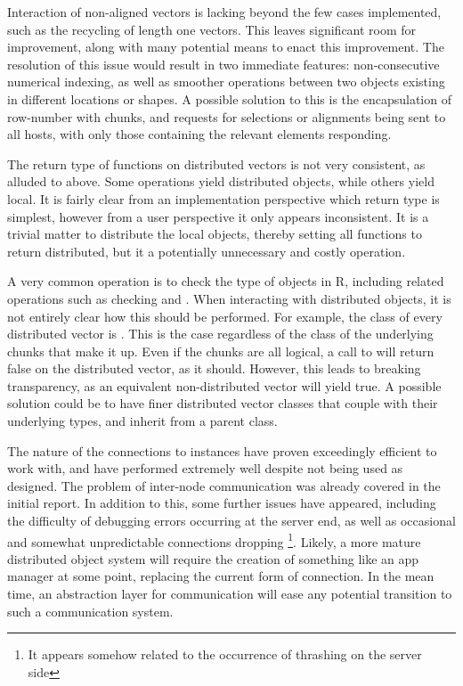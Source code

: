 Interaction of non-aligned vectors is lacking beyond the few cases implemented, such as the recycling of length one vectors.
This leaves significant room for improvement, along with many potential means to enact this improvement.
The resolution of this issue would result in two immediate features: non-consecutive numerical indexing, as well as smoother operations between two objects existing in different locations or shapes.
A possible solution to this is the encapsulation of row-number with chunks, and requests for selections or alignments being sent to all hosts, with only those containing the relevant elements responding.

The return type of functions on distributed vectors is not very consistent, as alluded to above.
Some operations yield distributed objects, while others yield local.
It is fairly clear from an implementation perspective which return type is simplest, however from a user perspective it only appears inconsistent.
It is a trivial matter to distribute the local objects, thereby setting all functions to return distributed, but it a potentially unnecessary and costly operation.

A very common operation is to check the type of objects in R, including related operations such as checking  and .
When interacting with distributed objects, it is not entirely clear how this should be performed.
For example, the class of every distributed vector is .
This is the case regardless of the class of the underlying chunks that make it up.
Even if the chunks are all logical, a call to  will return false on the distributed vector, as it should.
However, this leads to breaking transparency, as an equivalent non-distributed vector will yield true.
A possible solution could be to have finer distributed vector classes that couple with their underlying types, and inherit from a parent  class.

The nature of the connections to  instances have proven exceedingly efficient to work with, and have performed extremely well despite not being used as designed.
The problem of inter-node communication was already covered in the initial report.
In addition to this, some further issues have appeared, including the difficulty of debugging errors occurring at the server end, as well as occasional and somewhat unpredictable connections dropping \footnote{It appears somehow related to the occurrence of thrashing on the server side}.
Likely, a more mature distributed object system will require the creation of something like an app manager at some point, replacing the current  form of connection.
In the mean time, an abstraction layer for communication will ease any potential transition to such a communication system.


